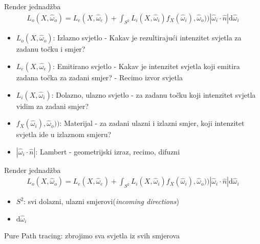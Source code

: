 \documentclass[9pt]{beamer}
\begin{document}
\begin{frame}{Render jednadžba}
	\begin{align*}
	L_o(X, \hat{\omega}_o) = L_e(X, \hat{\omega}_e) +
	\int_{S^2}  L_i(X, \hat{\omega}_i) f_X(\hat{\omega}_i), \hat{\omega}_o)) \left|\hat{\omega}_i\cdot \hat{n}\right| 
	\mathrm{d} \hat{\omega}_i
	\end{align*}
	\begin{itemize}
		\item $L_o(X, \hat{\omega}_o)$: Izlazno svjetlo - Kakav je rezultirajući intenzitet svjetla za zadanu točku i smjer?
		\item $L_e(X, \hat{\omega}_e)$: Emitirano svjetlo - Kakav je intenzitet svjetla koji emitira zadana točka za zadani smjer? - Recimo izvor svjetla
		\item $L_i(X, \hat{\omega}_i)$: Dolazno, ulazno svjetlo - za zadanu točku koji intenzitet svjetla vidim za zadani smjer?
		\item $f_X(\hat{\omega}_i), \hat{\omega}_o))$: Materijal - za zadani ulazni i izlazni smjer, koji intenzitet svjetla ide u izlaznom smjeru?
		\item $\left|\hat{\omega}_i\cdot \hat{n}\right|$: Lambert - geometrijski izraz, recimo, difuzni 
	\end{itemize}
\end{frame}

\begin{frame}{Render jednadžba}
	\begin{align*}
	L_o(X, \hat{\omega}_o) = L_e(X, \hat{\omega}_e) +
	\int_{S^2}  L_i(X, \hat{\omega}_i) f_X(\hat{\omega}_i), \hat{\omega}_o)) \left|\hat{\omega}_i\cdot \hat{n}\right| 
	\mathrm{d} \hat{\omega}_i
	\end{align*}
	\begin{itemize}
		\item $S^2$: svi dolazni, ulazni smjerovi(\textit{incoming directions})
		\item $\mathrm{d} \hat{\omega}_i$
	\end{itemize}
Pure Path tracing: zbrojimo sva svjetla iz svih smjerova
\end{frame}
\end{document}
